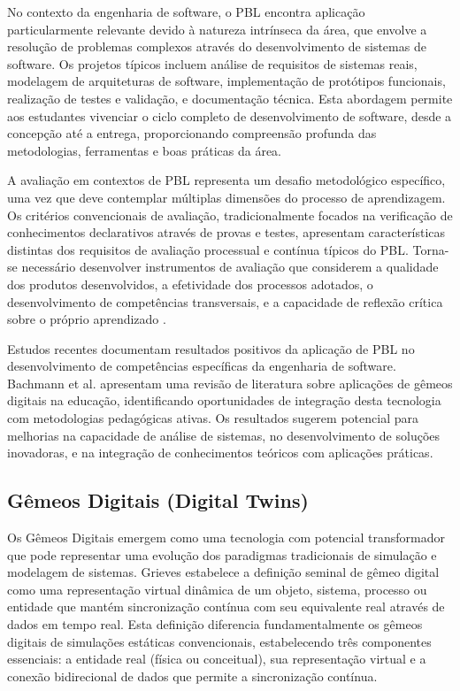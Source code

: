 \documentclass[12pt,a4paper]{article}
\begin{document}
No contexto da engenharia de software, o PBL encontra aplicação particularmente relevante devido à natureza intrínseca da área, que envolve a resolução de problemas complexos através do desenvolvimento de sistemas de software. Os projetos típicos incluem análise de requisitos de sistemas reais, modelagem de arquiteturas de software, implementação de protótipos funcionais, realização de testes e validação, e documentação técnica. Esta abordagem permite aos estudantes vivenciar o ciclo completo de desenvolvimento de software, desde a concepção até a entrega, proporcionando compreensão profunda das metodologias, ferramentas e boas práticas da área.

A avaliação em contextos de PBL representa um desafio metodológico específico, uma vez que deve contemplar múltiplas dimensões do processo de aprendizagem. Os critérios convencionais de avaliação, tradicionalmente focados na verificação de conhecimentos declarativos através de provas e testes, apresentam características distintas dos requisitos de avaliação processual e contínua típicos do PBL. Torna-se necessário desenvolver instrumentos de avaliação que considerem a qualidade dos produtos desenvolvidos, a efetividade dos processos adotados, o desenvolvimento de competências transversais, e a capacidade de reflexão crítica sobre o próprio aprendizado \cite{hmelo2004}.

Estudos recentes documentam resultados positivos da aplicação de PBL no desenvolvimento de competências específicas da engenharia de software. Bachmann et al. \cite{bachmann2023} apresentam uma revisão de literatura sobre aplicações de gêmeos digitais na educação, identificando oportunidades de integração desta tecnologia com metodologias pedagógicas ativas. Os resultados sugerem potencial para melhorias na capacidade de análise de sistemas, no desenvolvimento de soluções inovadoras, e na integração de conhecimentos teóricos com aplicações práticas.

\subsection{Gêmeos Digitais (Digital Twins)}

Os Gêmeos Digitais emergem como uma tecnologia com potencial transformador que pode representar uma evolução dos paradigmas tradicionais de simulação e modelagem de sistemas. Grieves \cite{grieves2014} estabelece a definição seminal de gêmeo digital como uma representação virtual dinâmica de um objeto, sistema, processo ou entidade que mantém sincronização contínua com seu equivalente real através de dados em tempo real. Esta definição diferencia fundamentalmente os gêmeos digitais de simulações estáticas convencionais, estabelecendo três componentes essenciais: a entidade real (física ou conceitual), sua representação virtual e a conexão bidirecional de dados que permite a sincronização contínua.
\end{document}
